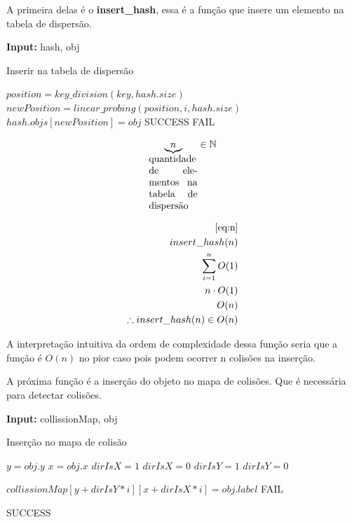 \documentclass[11pt]{article}
\begin{document}
A primeira delas é o \textbf{insert\_hash}, essa é a função que insere um elemento na tabela de dispersão.

\begin{algorithm}
\textbf{Input:} hash, obj
\caption{Inserir na tabela de dispersão}\label{algorithmdpsmudar}
\begin{algorithmic}[1]
	\State $position=key\_division(key,hash.size)$
		\State $newPosition = linear\_probing(position,i,hash.size)$
		\State $hash.objs[newPosition] = obj$
		\State \Return SUCCESS
		\EndIf
	\EndFor
	\State \Return FAIL
  \EndProcedure
\end{algorithmic}
\end{algorithm}

\begin{equation}\label{eq:n}
\underbrace{n}_{\parbox{1.75cm}{quantidade de elementos na tabela de dispersão}} \in \mathbb{N}\\
\end{equation}

\begin{equation}
\begin{aligned}
\eqref{eq:n}\\
insert\_hash(n)\\
\sum_{i=1}^{n} O(1)\\
n\cdot O(1)\\
O(n)\\
\therefore insert\_hash(n) \in O(n)
\end{aligned}
\end{equation}

A interpretação intuitiva da ordem de complexidade dessa função seria que a função é \(O(n)\) no pior caso pois podem ocorrer n colisões na inserção.

A próxima função é a inserção do objeto no mapa de colisões. Que é necessária para detectar colisões.

\begin{algorithm}
\textbf{Input:} collissionMap, obj
\caption{Inserção no mapa de colisão}\label{algorithmdpsmudar}
\begin{algorithmic}[1]
	\State $y = obj.y$
	\State $x = obj.x$
	{$dirIsX = 1$}
	{$dirIsX = 0$}
	{$dirIsY = 1$}
	{$dirIsY = 0$}

		\State $collissionMap[y+dirIsY*i][x+dirIsX*i] = obj.label$
		\Else
		\State \Return FAIL
		\EndIf

	\EndFor
	\State \Return SUCCESS
  \EndProcedure
\end{algorithmic}
\end{algorithm}
\end{document}
